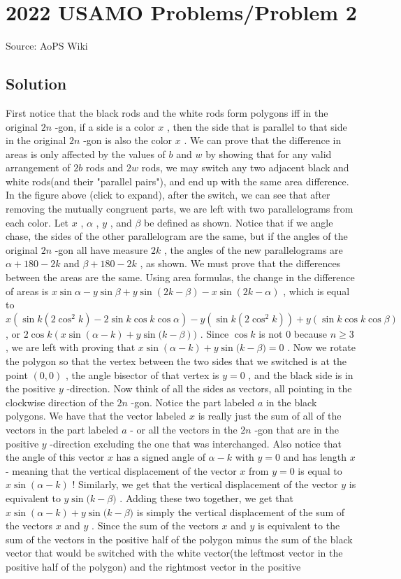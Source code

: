 \documentclass[12pt]{article}
\begin{document}
\section*{{2022 USAMO Problems/Problem 2}}
Source: AoPS Wiki

\subsection*{Solution}
First notice that the black rods and the white rods form polygons iff in the original $2n$ -gon, if a side is a color $x$ , then the side that is parallel to that side in the original $2n$ -gon is also the color $x$ . We can prove that the difference in areas is only affected by the values of $b$ and $w$ by showing that for any valid arrangement of $2b$ rods and $2w$ rods, we may switch any two adjacent black and white rods(and their "parallel pairs"), and end up with the same area difference. In the figure above (click to expand), after the switch, we can see that after removing the mutually congruent parts, we are left with two parallelograms from each color. Let $x$ , $\alpha{}$ , $y$ , and $\beta{}$ be defined as shown. Notice that if we angle chase, the sides of the other parallelogram are the same, but if the angles of the original $2n$ -gon all have measure $2k$ , the angles of the new parallelograms are $\alpha{}+180-2k$ and $\beta{}+180-2k$ , as shown. We must prove that the differences between the areas are the same. Using area formulas, the change in the difference of areas is $x\sin{\alpha{}}-y\sin{\beta{}}+y\sin{(2k-\beta{})}-x\sin{(2k-\alpha{})}$ , which is equal to $x(\sin{k}(2\cos^2{k})-2\sin{k}\cos{k}\cos{\alpha{}})-y(\sin{k}(2\cos^2{k}))+y(\sin{k}\cos{k}\cos{\beta{}})$ , or $2\cos{k}(x\sin{(\alpha{}-k)}+y\sin{(k-\beta{}}))$ . Since $\cos{k}$ is not $0$ because $n\geq{}3$ , we are left with proving that $x\sin{(\alpha{}-k)}+y\sin{(k-\beta{}})=0$ . Now we rotate the polygon so that the vertex between the two sides that we switched is at the point $(0,0)$ , the angle bisector of that vertex is $y=0$ , and the black side is in the positive $y$ -direction. Now think of all the sides as vectors, all pointing in the clockwise direction of the $2n$ -gon. Notice the part labeled $a$ in the black polygons. We have that the vector labeled $x$ is really just the sum of all of the vectors in the part labeled $a$ - or all the vectors in the $2n$ -gon that are in the positive $y$ -direction excluding the one that was interchanged. Also notice that the angle of this vector $x$ has a signed angle of $\alpha{}-k$ with $y=0$ and has length $x$ - meaning that the vertical displacement of the vector $x$ from $y=0$ is equal to $x\sin{(\alpha{}-k)}$ ! Similarly, we get that the vertical displacement of the vector $y$ is equivalent to $y\sin{(k-\beta{}})$ . Adding these two together, we get that $x\sin{(\alpha{}-k)}+y\sin{(k-\beta{}})$ is simply the vertical displacement of the sum of the vectors $x$ and $y$ . Since the sum of the vectors $x$ and $y$ is equivalent to the sum of the vectors in the positive half of the polygon minus the sum of the black vector that would be switched with the white vector(the leftmost vector in the positive half of the polygon) and the rightmost vector in the positive 
\end{document}
